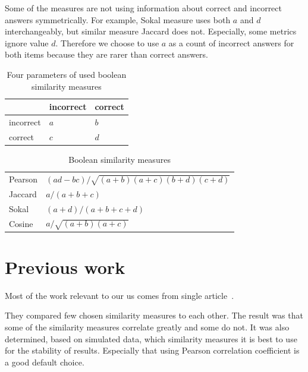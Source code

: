 \documentclass[
  printed, %
  table,   %
  nolof,     %
  nolot,     %
  color,
  final,
  nocover
]{fithesis3}
\begin{document}
Some of the measures are not using information about correct and incorrect answers symmetrically. For example, Sokal measure uses both $a$ and $d$ interchangeably, but similar measure Jaccard does not. Especially, some metrics ignore value $d$. Therefore we choose to use $a$ as a count of incorrect answers for both items because they are rarer than correct answers.


\begin{table}
  \begin{tabular}{ | l | l l | }
      \hline
      \cellcolor[gray]{1.0} & incorrect & correct \\ \hline
      incorrect & $a$ & $b$ \\
      correct & $c$ & $d$ \\ \hline
  \end{tabular}

  \caption{Four parameters of used boolean similarity measures}
  \label{tab:boolean-attributes}
\end{table}

\begin{table}
  \begin{tabular}{ | l | l | }
        \hline
      Pearson & $(ad - bc) / \sqrt{(a+b)(a+c)(b+d)(c+d)}$ \\
      Jaccard & $a / (a+b+c)$                             \\
      Sokal   & $(a+d)/(a+b+c+d)$                         \\
      Cosine  & $a / \sqrt{ (a+b)(a+c) }$                 \\
      \hline
  \end{tabular}
  \caption{Boolean similarity measures}
  \label{tab:boolean-similarity-measures}
\end{table}


\section{Previous work}\label{previous-work}

Most of the work relevant to our us comes from single article~\cite{pelanek2017measuring}.

They compared few chosen similarity measures to each other. The result was that some of the similarity measures correlate greatly and some do not. It was also determined, based on simulated data, which similarity measures it is best to use for the stability of results. Especially that using Pearson correlation coefficient is a good default choice.
\end{document}
